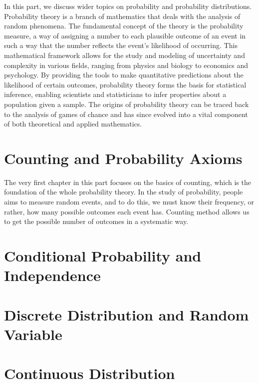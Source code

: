 \chapterspaceabove{6.75cm} 
\chapterspacebelow{7.25cm} 


In this part, we discuss wider topics on probability and probability distributions. 
Probability theory is a branch of mathematics that deals with the analysis of random phenomena. The fundamental concept of the theory is the probability measure, a way of assigning a number to each plausible outcome of an event in such a way that the number reflects the event's likelihood of occurring. This mathematical framework allows for the study and modeling of uncertainty and complexity in various fields, ranging from physics and biology to economics and psychology. By providing the tools to make quantitative predictions about the likelihood of certain outcomes, probability theory forms the basis for statistical inference, enabling scientists and statisticians to infer properties about a population given a sample. The origins of probability theory can be traced back to the analysis of games of chance and has since evolved into a vital component of both theoretical and applied mathematics.
\chapter{Counting and Probability Axioms}

The very first chapter in this part focuses on the basics of counting, which is the foundation of the whole probability theory. In the study of probability, people aims to measure random events, and to do this, we must know their frequency, or rather, how many possible outcomes each event has. Counting method allows us to get the possible number of outcomes in a systematic way.



\chapterspaceabove{6.75cm} 
\chapterspacebelow{7.25cm} 
\chapter{Conditional Probability and Independence}


\chapterspaceabove{6.75cm} 
\chapterspacebelow{7.25cm} 
\chapter{Discrete Distribution and Random Variable}


\chapterspaceabove{6.75cm} 
\chapterspacebelow{7.25cm} 
\chapter{Continuous Distribution}



